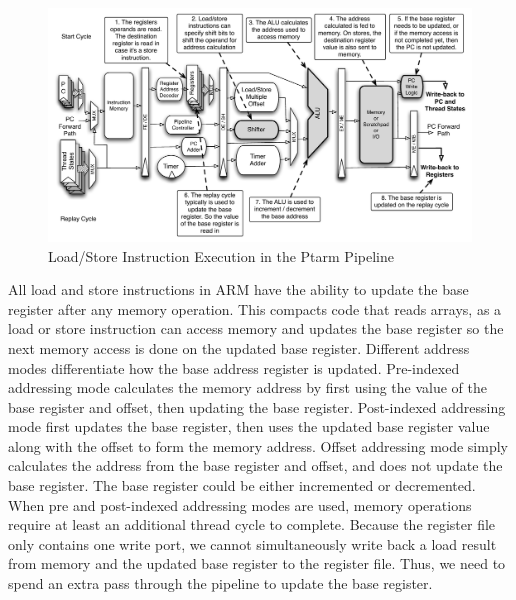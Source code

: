 \begin{figure}
  \vspace{-20pt}
  \begin{center}
    \includegraphics[scale=.54]{figs/ldstr_pipeline_implementation}
  \end{center}
  \vspace{-20pt}
  \caption{Load/Store Instruction Execution in the Ptarm Pipeline}
  \label{fig:ldstr_pipeline_implementation}
\end{figure}

All load and store instructions in ARM have the ability to update the base register after any memory operation. 
This compacts code that reads arrays, as a load or store instruction can access memory and updates the base register so the next memory access is done on the updated base register.
Different address modes differentiate how the base address register is updated. 
Pre-indexed addressing mode calculates the memory address by first using the value of the base register and offset, then updating the base register. 
Post-indexed addressing mode first updates the base register, then uses the updated base register value along with the offset to form the memory address.
Offset addressing mode simply calculates the address from the base register and offset, and does not update the base register. 
The base register could be either incremented or decremented. 
When pre and post-indexed addressing modes are used, memory operations require at least an additional thread cycle to complete.
Because the register file only contains one write port, we cannot simultaneously write back a load result from memory and the updated base register to the register file. 
Thus, we need to spend an extra pass through the pipeline to update the base register.

